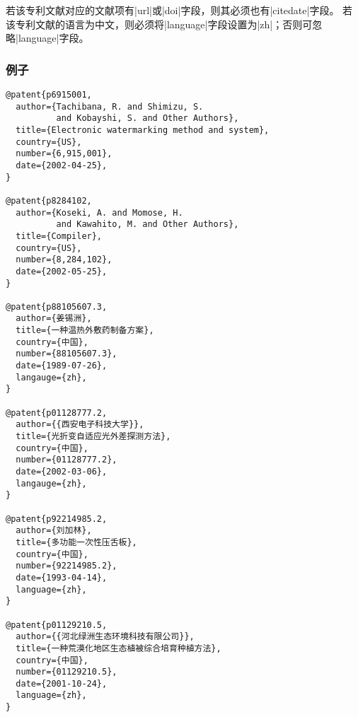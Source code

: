 \begin{note}
若该专利文献对应的文献项有|url|或|doi|字段，则其必须也有|citedate|字段。
若该专利文献的语言为中文，则必须将|language|字段设置为|zh|；否则可忽略|language|字段。
\end{note}

\subsubsection{例子}

\begin{verbatim}
@patent{p6915001,
  author={Tachibana, R. and Shimizu, S. 
          and Kobayshi, S. and Other Authors},
  title={Electronic watermarking method and system},
  country={US},
  number={6,915,001},
  date={2002-04-25},
}

@patent{p8284102,
  author={Koseki, A. and Momose, H. 
          and Kawahito, M. and Other Authors},
  title={Compiler},
  country={US},
  number={8,284,102},
  date={2002-05-25},
}

@patent{p88105607.3,
  author={姜锡洲},
  title={一种温热外敷药制备方案},
  country={中国},
  number={88105607.3},
  date={1989-07-26},
  langauge={zh},
}

@patent{p01128777.2,
  author={{西安电子科技大学}},
  title={光折变自适应光外差探测方法},
  country={中国},
  number={01128777.2},
  date={2002-03-06},
  langauge={zh},
}

@patent{p92214985.2,
  author={刘加林},
  title={多功能一次性压舌板},
  country={中国},
  number={92214985.2},
  date={1993-04-14},
  language={zh},
}

@patent{p01129210.5,
  author={{河北绿洲生态环境科技有限公司}},
  title={一种荒漠化地区生态植被综合培育种植方法},
  country={中国},
  number={01129210.5},
  date={2001-10-24},
  language={zh},
}
\end{verbatim}


